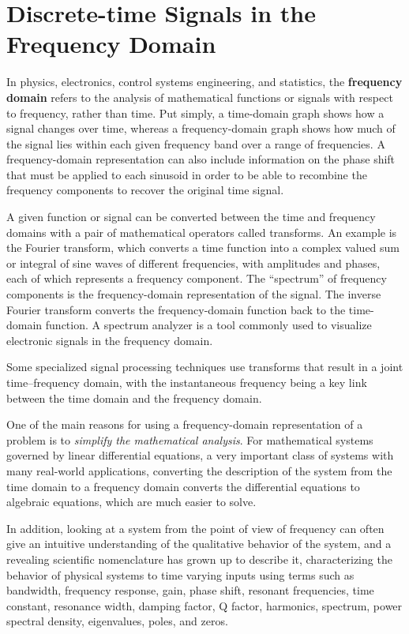\documentclass[\documentfontsize, twocolumn]{\classname}
\begin{document}
\chapter{Discrete-time Signals in the Frequency Domain}
In physics, electronics, control systems engineering, and statistics, the \textbf{frequency domain} refers to the analysis of mathematical functions or signals with respect to frequency, rather than time. Put simply, a time-domain graph shows how a signal changes over time, whereas a frequency-domain graph shows how much of the signal lies within each given frequency band over a range of frequencies. A frequency-domain representation can also include information on the phase shift that must be applied to each sinusoid in order to be able to recombine the frequency components to recover the original time signal.

A given function or signal can be converted between the time and frequency domains with a pair of mathematical operators called transforms. An example is the Fourier transform, which converts a time function into a complex valued sum or integral of sine waves of different frequencies, with amplitudes and phases, each of which represents a frequency component. The ``spectrum'' of frequency components is the frequency-domain representation of the signal. The inverse Fourier transform converts the frequency-domain function back to the time-domain function. A spectrum analyzer is a tool commonly used to visualize electronic signals in the frequency domain.

Some specialized signal processing techniques use transforms that result in a joint time–frequency domain, with the instantaneous frequency being a key link between the time domain and the frequency domain.

One of the main reasons for using a frequency-domain representation of a problem is to \emph{simplify the mathematical analysis}. For mathematical systems governed by linear differential equations, a very important class of systems with many real-world applications, converting the description of the system from the time domain to a frequency domain converts the differential equations to algebraic equations, which are much easier to solve.

In addition, looking at a system from the point of view of frequency can often give an intuitive understanding of the qualitative behavior of the system, and a revealing scientific nomenclature has grown up to describe it, characterizing the behavior of physical systems to time varying inputs using terms such as bandwidth, frequency response, gain, phase shift, resonant frequencies, time constant, resonance width, damping factor, Q factor, harmonics, spectrum, power spectral density, eigenvalues, poles, and zeros.
\end{document}
